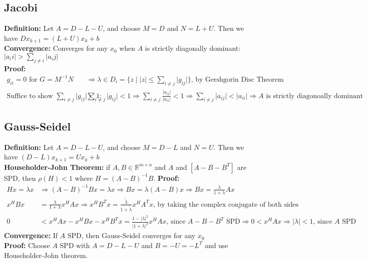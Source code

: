 \documentclass{article}
\newcommand{\abs}[1]{\lvert#1\rvert}
\begin{document}
\subsection{Jacobi}
\textbf{Definition: }Let $A = D - L - U$, and choose $M = D$ and $N = L+U$. Then we have $Dx_{k+1} = (L+U)x_k + b$\\
\textbf{Convergence: }Converges for any $x_0$ when $A$ is strictly diagonally dominant: $\abs{a_ii} > \sum_{j\neq i} \abs{a_ij}$\\
\textbf{Proof: }
\begin{align*}
    g_{ii} = 0 \textrm{ for } G = M^{-1}N &\Longrightarrow \lambda \in D_i = \{ z \mid \abs{z} \leq \sum_{i\neq j}\abs{g_{ij}}\} \textrm{, by Gershgorin Disc Theorem}\\
    \textrm{Suffice to show } \sum_{i\neq j}\abs{g_{ij}} < 1: \; \;& \sum_{i\neq j}\abs{g_{ij}} < 1 \Longrightarrow \sum_{i\neq j} \frac{\abs{a_{ij}}}{\abs{a_{ii}}} <1 \Longrightarrow \sum_{i\neq j}\abs{a_{ij}} < \abs{a_{ii}} \Longrightarrow \textrm{$A$ is strictly diagonoally dominant}
\end{align*}

\subsection{Gauss-Seidel}
\textbf{Definition: } Let $A = D - L - U$, and choose $M = D - L$ and $N = U$. Then we have $(D - L)x_{k+1} = Ux_k + b$\\
\textbf{Householder-John Theorem: } if $A, B \in \mathbb{R}^{m \times n}$ and $A$ and $[A - B - B^T]$ are SPD, then $\rho(H) < 1$ where $H = (A - B)^{-1}B$. \textbf{Proof:}
\begin{align*}
    Hx = \lambda x &\Longrightarrow (A - B)^{-1}Bx = \lambda x \Longrightarrow Bx = \lambda (A - B)x \Longrightarrow Bx = \frac{\lambda}{1 + \lambda}Ax\\
    x^HBx &= \frac{\lambda}{1 + \lambda}x^HAx \Longrightarrow x^HB^Tx = \frac{\tilde{\lambda}}{1 + \tilde{\lambda}}x^HA^Tx \textrm{, by taking the complex conjugate of both sides}\\
    0 &< x^HAx - x^HBx - x^HB^Tx = \frac{1 - \abs{\lambda}^2}{\abs{1 + \lambda}^2}x^HAx \textrm{, since $A-B-B^T$ SPD} \Longrightarrow 0 < x^HAx \Longrightarrow \abs{\lambda}<1 \textrm{, since $A$ SPD}
\end{align*}
\textbf{Convergence: } If $A$ SPD, then Gauss-Seidel converges for any $x_0$\\
\textbf{Proof:} Choose $A$ SPD with $A = D - L - U$ and $B = -U = -L^T$ and use Householder-John theorem. 
\end{document}
